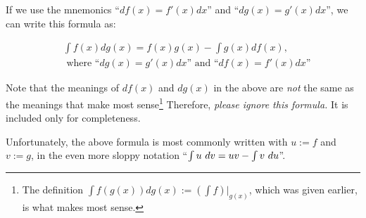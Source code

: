 \begin{itemize}
    If we use the mnemonics ``$df(x) = f'(x) dx$'' and ``$dg(x) = g'(x) dx$'', we can write this formula as:

    \begin{align*}
        &\int f(x) dg(x) = f(x) g(x) - \int g(x) df(x), \\
        &\text{ where ``$dg(x) = g'(x) dx$'' and ``$df(x) = f'(x) dx$''}
    \end{align*}

    Note that the meanings of $df(x)$ and $dg(x)$ in the above are \textit{not} the same as the meanings that make most sense\footnote{The definition $\int f(g(x)) dg(x) := (\int f)|_{g(x)}$, which was given earlier, is what makes most sense.} Therefore, \textit{please ignore this formula.} It is included only for completeness.

    Unfortunately, the above formula is most commonly written with $u := f$ and $v := g$, in the even more sloppy notation ``${\int u \text{ } dv = uv - \int v \text{ } du}$''.
\end{itemize}